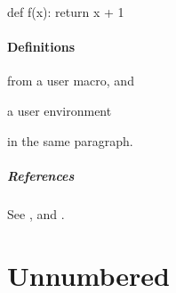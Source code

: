 \begin{flmVerbatimCode}[python]
def f(x):
    return {x} + 1
\end{flmVerbatimCode}

\flmHeading[toc=true]
\paragraph{Definitions}{\flmLabels{}}

 from a user macro, and \begin{flmUEnote}a user environment\end{flmUEnote}
in the same paragraph.

\flmHeading[toc=true]
\subparagraph{References}{\flmLabels{}}

See ,  and .

\flmHeading[toc=true]
\section*{Unnumbered}{\flmLabels{}}

